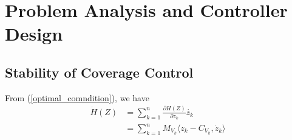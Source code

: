 
\newcommand{\twopartdef}[4]
{
	\left\{
	\begin{array}{ll}
		#1 &  #2 \\
		#3 &  #4
	\end{array}
	\right.
}

\newcommand*\interior[1]{#1^{\mathsf{o}}}

\newcommand*{\QEDA}{\hfill\ensuremath{\blacksquare}}%

\newcommand{\tab}[1]{\hspace{.1\textwidth}\rlap{#1}}

\newenvironment{tightcenter}{%
	\setlength\topsep{0pt}
	\setlength\parskip{0pt}
	\begin{center}
	}{%
	\end{center}
}



\chapter{Problem Analysis and Controller Design}\label{chapter: theory}

\section{Stability of Coverage Control}
From (\ref{optimal_comndition}), we have
\begin{equation} \label{primitive_time_derivative_cost_function}
\begin{split}
\dot H(Z) & = \displaystyle\sum_{k=1}^{n}\frac{\partial H(Z)}{\partial {z_k}} \dot{z_k} \\
& = \displaystyle\sum_{k=1}^{n} M_{V_{k}}\langle{z_{k} - C_{V_{k}},\dot{z}_k}\rangle \\
\end{split}
\end{equation}

